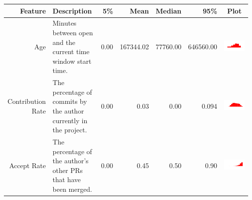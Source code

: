 \documentclass[conference]{IEEEtran}
\begin{document}
\begin{table}[ht]
  \centering
  \begin{tabular}{rp{26em}rrrrc}
    \hline
    \textbf{Feature} & \textbf{Description} & \textbf{5\%} & \textbf{Mean} & \textbf{Median} & \textbf{95\%} & \textbf{Plot} \\
    \hline
    Age & Minutes between open and the current time window start time. & 0.00 & 167344.02 & 77760.00 & 646560.00 & \includegraphics[scale = 0.09, clip = true, trim= 50px 60px 50px 60px]{../figs/hist-features/hist-age.pdf} \\
    Contribution Rate & The percentage of commits by the author currently in the project. & 0.00 & 0.03 & 0.00 & 0.094 & \includegraphics[scale = 0.09, clip = true, trim= 50px 60px 50px 60px]{../figs/hist-features/hist-commitRatio.pdf} \\
    Accept Rate & The percentage of the author's other PRs that have been merged. & 0.00 & 0.45 & 0.50 & 0.90 & \includegraphics[scale = 0.09, clip = true, trim= 50px 60px 50px 60px]{../figs/hist-features/hist-pullRequestRatio.pdf} \\

\end{tabular}
\end{table}
\end{document}
